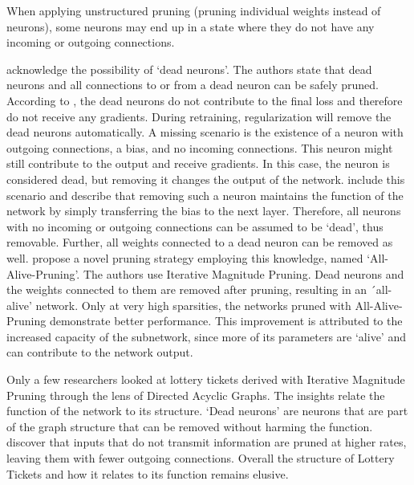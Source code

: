 When applying unstructured pruning (pruning individual weights instead of neurons), some neurons may end up in a state where they do not have any incoming or outgoing connections. 

\textcite{HanEtAl15} acknowledge the possibility of `dead neurons'. 
The authors state that dead neurons and all connections to or from a dead neuron can be safely pruned.
According to \autocite{HanEtAl15}, the dead neurons do not contribute to the final loss and therefore do not receive any gradients. 
During retraining, regularization will remove the dead neurons automatically. 
A missing scenario is the existence of a neuron with outgoing connections, a bias, and no incoming connections. This neuron might still contribute to the output and receive gradients. 
In this case, the neuron is considered dead, but removing it changes the output of the network.
\textcite{AllAlivePruning} include this scenario and describe that removing such a neuron maintains the function of the network by simply transferring the bias to the next layer. 
Therefore, all neurons with no incoming or outgoing connections can be assumed to be `dead', thus removable. Further, all weights connected to a dead neuron can be removed as well.
\textcite{AllAlivePruning} propose a novel pruning strategy employing this knowledge, named `All-Alive-Pruning'. 
The authors use Iterative Magnitude Pruning. Dead neurons and the weights connected to them are removed after pruning, resulting in an ´all-alive' network.
Only at very high sparsities, the networks pruned with All-Alive-Pruning demonstrate better performance. 
This improvement is attributed to the increased capacity of the subnetwork, since more of its parameters are `alive' and can contribute to the network output.

Only a few researchers looked at lottery tickets derived with Iterative Magnitude Pruning through the lens of Directed Acyclic Graphs. 
The insights relate the function of the network to its structure.
`Dead neurons' \autocite{HanEtAl15, AllAlivePruning} are neurons that are part of the graph structure that can be removed without harming the function. 
\textcite{LTH} discover that inputs that do not transmit information are pruned at higher rates, leaving them with fewer outgoing connections.
Overall the structure of Lottery Tickets and how it relates to its function remains elusive.

